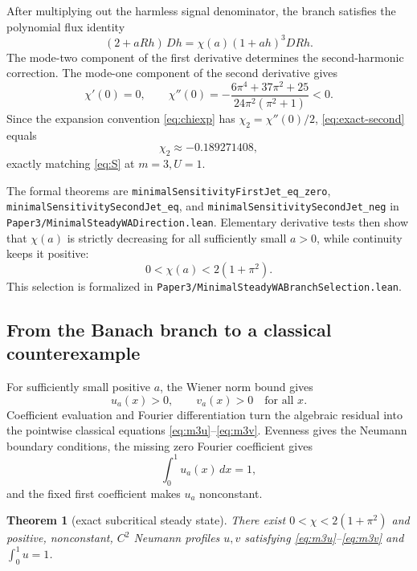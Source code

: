 \documentclass[11pt]{article}
\newcommand{\code}[1]{\nolinkurl{#1}}
\newtheorem{theorem}{Theorem}
\begin{document}
After multiplying out the harmless signal denominator, the branch satisfies
the polynomial flux identity
\begin{equation}
  (2+aRh)\,Dh=\chi(a)(1+ah)^3DRh.                       \label{eq:poly}
\end{equation}
The mode-two component of the first derivative determines the second-harmonic
correction.  The mode-one component of the second derivative gives
\begin{equation}
 \chi'(0)=0,\qquad
 \chi''(0)=
 -\frac{6\pi^4+37\pi^2+25}
 {24\pi^2(\pi^2+1)}<0.                                 \label{eq:exact-second}
\end{equation}
Since the expansion convention \eqref{eq:chiexp} has
\(\chi_2=\chi''(0)/2\), \eqref{eq:exact-second} equals
\[
  \chi_2\approx-0.189271408,
\]
exactly matching \eqref{eq:S} at \(m=3,U=1\).

The formal theorems are
\code{minimalSensitivityFirstJet_eq_zero},
\code{minimalSensitivitySecondJet_eq}, and
\code{minimalSensitivitySecondJet_neg} in
\code{Paper3/MinimalSteadyWADirection.lean}.  Elementary derivative tests
then show that \(\chi(a)\) is strictly decreasing for all sufficiently small
\(a>0\), while continuity keeps it positive:
\begin{equation}
  0<\chi(a)<2(1+\pi^2).                                 \label{eq:backward}
\end{equation}
This selection is formalized in
\code{Paper3/MinimalSteadyWABranchSelection.lean}.

\subsection{From the Banach branch to a classical counterexample}

For sufficiently small positive \(a\), the Wiener norm bound gives
\[
  u_a(x)>0,\qquad v_a(x)>0\quad\text{for all }x.
\]
Coefficient evaluation and Fourier differentiation turn the algebraic
residual into the pointwise classical equations
\eqref{eq:m3u}--\eqref{eq:m3v}.  Evenness gives the Neumann boundary
conditions, the missing zero Fourier coefficient gives
\[
  \int_0^1u_a(x)\,dx=1,
\]
and the fixed first coefficient makes \(u_a\) nonconstant.

\begin{theorem}[exact subcritical steady state]
There exist \(0<\chi<2(1+\pi^2)\) and positive, nonconstant, \(C^2\) Neumann
profiles \(u,v\) satisfying \eqref{eq:m3u}--\eqref{eq:m3v} and
\(\int_0^1u=1\).
\end{theorem}
\end{document}
